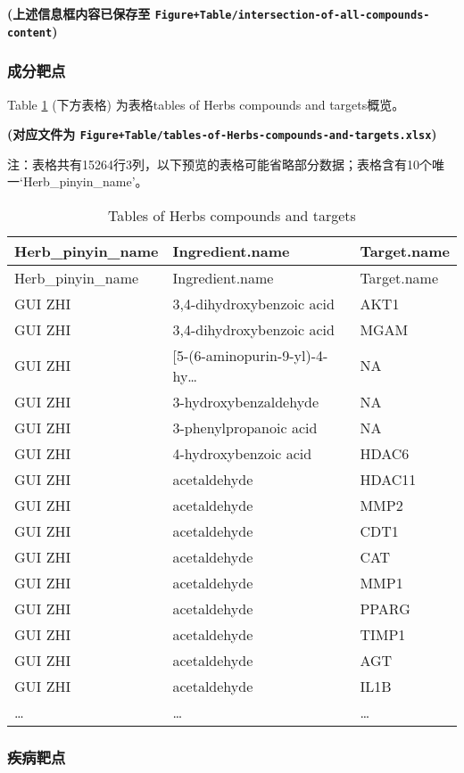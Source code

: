 \documentclass[
]{article}
\begin{document}
\textbf{(上述信息框内容已保存至 \texttt{Figure+Table/intersection-of-all-compounds-content})}

\hypertarget{ux6210ux5206ux9776ux70b9}{%
\subsubsection{成分靶点}\label{ux6210ux5206ux9776ux70b9}}

Table \ref{tab:tables-of-Herbs-compounds-and-targets} (下方表格) 为表格tables of Herbs compounds and targets概览。

\textbf{(对应文件为 \texttt{Figure+Table/tables-of-Herbs-compounds-and-targets.xlsx})}

\begin{center}\begin{tcolorbox}[colback=gray!10, colframe=gray!50, width=0.9\linewidth, arc=1mm, boxrule=0.5pt]注：表格共有15264行3列，以下预览的表格可能省略部分数据；表格含有10个唯一`Herb\_pinyin\_name'。
\end{tcolorbox}
\end{center}

\begin{longtable}[]{@{}lll@{}}
\caption{\label{tab:tables-of-Herbs-compounds-and-targets}Tables of Herbs compounds and targets}\tabularnewline
\toprule
Herb\_pinyin\_name & Ingredient.name & Target.name\tabularnewline
\midrule
\endfirsthead
\toprule
Herb\_pinyin\_name & Ingredient.name & Target.name\tabularnewline
\midrule
\endhead
GUI ZHI & 3,4-dihydroxybenzoic acid & AKT1\tabularnewline
GUI ZHI & 3,4-dihydroxybenzoic acid & MGAM\tabularnewline
GUI ZHI & {[}5-(6-aminopurin-9-yl)-4-hy\ldots{} & NA\tabularnewline
GUI ZHI & 3-hydroxybenzaldehyde & NA\tabularnewline
GUI ZHI & 3-phenylpropanoic acid & NA\tabularnewline
GUI ZHI & 4-hydroxybenzoic acid & HDAC6\tabularnewline
GUI ZHI & acetaldehyde & HDAC11\tabularnewline
GUI ZHI & acetaldehyde & MMP2\tabularnewline
GUI ZHI & acetaldehyde & CDT1\tabularnewline
GUI ZHI & acetaldehyde & CAT\tabularnewline
GUI ZHI & acetaldehyde & MMP1\tabularnewline
GUI ZHI & acetaldehyde & PPARG\tabularnewline
GUI ZHI & acetaldehyde & TIMP1\tabularnewline
GUI ZHI & acetaldehyde & AGT\tabularnewline
GUI ZHI & acetaldehyde & IL1B\tabularnewline
\ldots{} & \ldots{} & \ldots{}\tabularnewline
\bottomrule
\end{longtable}

\hypertarget{ux75beux75c5ux9776ux70b9}{%
\subsubsection{疾病靶点}\label{ux75beux75c5ux9776ux70b9}}
\end{document}
